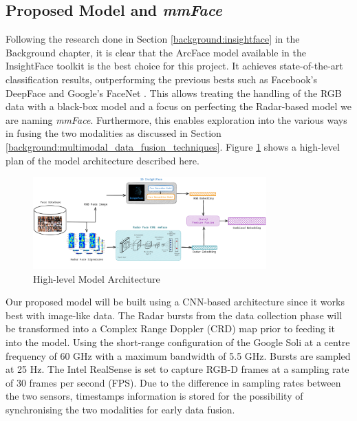\documentclass{interim}
\begin{document}
\subsection{Proposed Model and \textit{mmFace}}
Following the research done in Section \ref{background:insightface} in the Background chapter, it is clear that the ArcFace model available in the InsightFace toolkit is the best choice for this project. It achieves state-of-the-art classification results, outperforming the previous bests such as Facebook's DeepFace \cite{taigman2014deepface} and Google's FaceNet \cite{schroff2015facenet}. This allows treating the handling of the RGB data with a black-box model and a focus on perfecting the Radar-based model we are naming \textit{mmFace}. Furthermore, this enables exploration into the various ways in fusing the two modalities as discussed in Section \ref{background:multimodal_data_fusion_techniques}. Figure \ref{fig:model_architecture} shows a high-level plan of the model architecture described here.

\begin{figure}[h!]
    \centering
    \includegraphics[width=0.8\textwidth]{images/model_architecture.png}
    \caption{High-level Model Architecture}
    \label{fig:model_architecture}
\end{figure}

Our proposed model will be built using a CNN-based architecture since it works best with image-like data. The Radar bursts from the data collection phase will be transformed into a Complex Range Doppler (CRD) map \cite{lien2016soli, hayashi2021radarnet} prior to feeding it into the model. Using the short-range configuration of the Google Soli at a centre frequency of 60 GHz with a maximum bandwidth of 5.5 GHz. Bursts are sampled at 25 Hz. The Intel RealSense is set to capture RGB-D frames at a sampling rate of 30 frames per second (FPS). Due to the difference in sampling rates between the two sensors, timestamps information is stored for the possibility of synchronising the two modalities for early data fusion.
\end{document}
